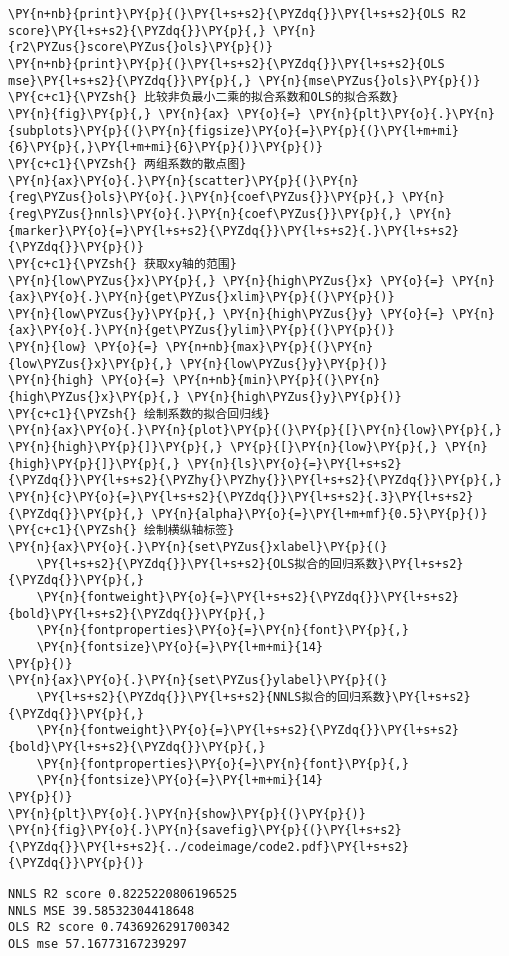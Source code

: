 \begin{Verbatim}[commandchars=\\\{\}]
\PY{n+nb}{print}\PY{p}{(}\PY{l+s+s2}{\PYZdq{}}\PY{l+s+s2}{OLS R2 score}\PY{l+s+s2}{\PYZdq{}}\PY{p}{,} \PY{n}{r2\PYZus{}score\PYZus{}ols}\PY{p}{)}
\PY{n+nb}{print}\PY{p}{(}\PY{l+s+s2}{\PYZdq{}}\PY{l+s+s2}{OLS mse}\PY{l+s+s2}{\PYZdq{}}\PY{p}{,} \PY{n}{mse\PYZus{}ols}\PY{p}{)}
\PY{c+c1}{\PYZsh{} 比较非负最小二乘的拟合系数和OLS的拟合系数}
\PY{n}{fig}\PY{p}{,} \PY{n}{ax} \PY{o}{=} \PY{n}{plt}\PY{o}{.}\PY{n}{subplots}\PY{p}{(}\PY{n}{figsize}\PY{o}{=}\PY{p}{(}\PY{l+m+mi}{6}\PY{p}{,}\PY{l+m+mi}{6}\PY{p}{)}\PY{p}{)}
\PY{c+c1}{\PYZsh{} 两组系数的散点图}
\PY{n}{ax}\PY{o}{.}\PY{n}{scatter}\PY{p}{(}\PY{n}{reg\PYZus{}ols}\PY{o}{.}\PY{n}{coef\PYZus{}}\PY{p}{,} \PY{n}{reg\PYZus{}nnls}\PY{o}{.}\PY{n}{coef\PYZus{}}\PY{p}{,} \PY{n}{marker}\PY{o}{=}\PY{l+s+s2}{\PYZdq{}}\PY{l+s+s2}{.}\PY{l+s+s2}{\PYZdq{}}\PY{p}{)}
\PY{c+c1}{\PYZsh{} 获取xy轴的范围}
\PY{n}{low\PYZus{}x}\PY{p}{,} \PY{n}{high\PYZus{}x} \PY{o}{=} \PY{n}{ax}\PY{o}{.}\PY{n}{get\PYZus{}xlim}\PY{p}{(}\PY{p}{)}
\PY{n}{low\PYZus{}y}\PY{p}{,} \PY{n}{high\PYZus{}y} \PY{o}{=} \PY{n}{ax}\PY{o}{.}\PY{n}{get\PYZus{}ylim}\PY{p}{(}\PY{p}{)}
\PY{n}{low} \PY{o}{=} \PY{n+nb}{max}\PY{p}{(}\PY{n}{low\PYZus{}x}\PY{p}{,} \PY{n}{low\PYZus{}y}\PY{p}{)}
\PY{n}{high} \PY{o}{=} \PY{n+nb}{min}\PY{p}{(}\PY{n}{high\PYZus{}x}\PY{p}{,} \PY{n}{high\PYZus{}y}\PY{p}{)}
\PY{c+c1}{\PYZsh{} 绘制系数的拟合回归线}
\PY{n}{ax}\PY{o}{.}\PY{n}{plot}\PY{p}{(}\PY{p}{[}\PY{n}{low}\PY{p}{,} \PY{n}{high}\PY{p}{]}\PY{p}{,} \PY{p}{[}\PY{n}{low}\PY{p}{,} \PY{n}{high}\PY{p}{]}\PY{p}{,} \PY{n}{ls}\PY{o}{=}\PY{l+s+s2}{\PYZdq{}}\PY{l+s+s2}{\PYZhy{}\PYZhy{}}\PY{l+s+s2}{\PYZdq{}}\PY{p}{,} \PY{n}{c}\PY{o}{=}\PY{l+s+s2}{\PYZdq{}}\PY{l+s+s2}{.3}\PY{l+s+s2}{\PYZdq{}}\PY{p}{,} \PY{n}{alpha}\PY{o}{=}\PY{l+m+mf}{0.5}\PY{p}{)}
\PY{c+c1}{\PYZsh{} 绘制横纵轴标签}
\PY{n}{ax}\PY{o}{.}\PY{n}{set\PYZus{}xlabel}\PY{p}{(}
    \PY{l+s+s2}{\PYZdq{}}\PY{l+s+s2}{OLS拟合的回归系数}\PY{l+s+s2}{\PYZdq{}}\PY{p}{,} 
    \PY{n}{fontweight}\PY{o}{=}\PY{l+s+s2}{\PYZdq{}}\PY{l+s+s2}{bold}\PY{l+s+s2}{\PYZdq{}}\PY{p}{,} 
    \PY{n}{fontproperties}\PY{o}{=}\PY{n}{font}\PY{p}{,}
    \PY{n}{fontsize}\PY{o}{=}\PY{l+m+mi}{14}
\PY{p}{)}
\PY{n}{ax}\PY{o}{.}\PY{n}{set\PYZus{}ylabel}\PY{p}{(}
    \PY{l+s+s2}{\PYZdq{}}\PY{l+s+s2}{NNLS拟合的回归系数}\PY{l+s+s2}{\PYZdq{}}\PY{p}{,} 
    \PY{n}{fontweight}\PY{o}{=}\PY{l+s+s2}{\PYZdq{}}\PY{l+s+s2}{bold}\PY{l+s+s2}{\PYZdq{}}\PY{p}{,} 
    \PY{n}{fontproperties}\PY{o}{=}\PY{n}{font}\PY{p}{,}
    \PY{n}{fontsize}\PY{o}{=}\PY{l+m+mi}{14}
\PY{p}{)}
\PY{n}{plt}\PY{o}{.}\PY{n}{show}\PY{p}{(}\PY{p}{)}
\PY{n}{fig}\PY{o}{.}\PY{n}{savefig}\PY{p}{(}\PY{l+s+s2}{\PYZdq{}}\PY{l+s+s2}{../codeimage/code2.pdf}\PY{l+s+s2}{\PYZdq{}}\PY{p}{)}
\end{Verbatim}

\begin{Verbatim}[commandchars=\\\{\}]
NNLS R2 score 0.8225220806196525
NNLS MSE 39.58532304418648
OLS R2 score 0.7436926291700342
OLS mse 57.16773167239297
\end{Verbatim}
